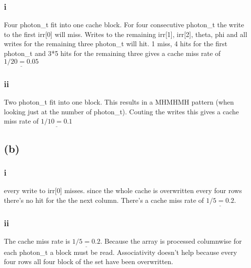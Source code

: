 \documentclass[10pt,a4paper,oneside,notitlepage]{report}
\begin{document}
\subsubsection*{i}
Four photon\_t fit into one cache block. For four consecutive photon\_t the write to the first irr[0] will miss. Writes to the remaining irr[1], irr[2], theta, phi and all writes for the remaining three photon\_t will hit. 1 miss, 4 hits for the first photon\_t and 3*5 hits for the remaining three gives a cache miss rate of $\underline{1/20=0.05}$
\subsubsection*{ii}
Two photon\_t fit into one block. This results in a MHMHMH pattern (when looking just at the number of photon\_t). Couting the writes this gives a cache miss rate of $\underline{1/10=0.1}$
\subsection*{(b)}
\subsubsection*{i}
every write to irr[0] misses. since the whole cache is overwritten every four rows there's no hit for the the next column. There's a cache miss rate of $\underline{1/5=0.2}$.
\subsubsection*{ii}
The cache miss rate is $\underline{1/5=0.2}$. Because the array is processed columnwise for each photon\_t a block must be read. Associativity doesn't help because every four rows all four block of the set have been overwritten.
\end{document}
